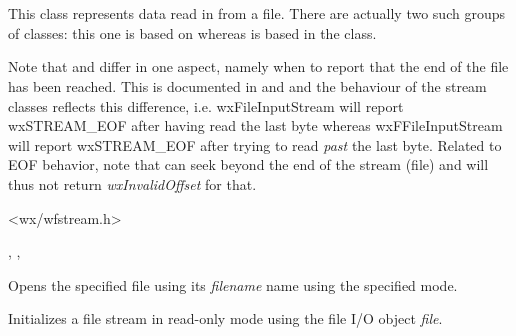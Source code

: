 \section{}\label{wxffileinputstream}

This class represents data read in from a file. There are actually
two such groups of classes: this one is based on  
whereas  is based in
the  class.

Note that  and  differ
in one aspect, namely when to report that the end of the file has been
reached. This is documented in  and 
 and the behaviour of the stream
classes reflects this difference, i.e. wxFileInputStream will report
wxSTREAM\_EOF after having read the last byte whereas wxFFileInputStream
will report wxSTREAM\_EOF after trying to read {\it past} the last byte.
Related to EOF behavior, note that  
can seek beyond the end of the stream (file) and will thus not return 
{\it wxInvalidOffset} for that.




<wx/wfstream.h>


, , 


\label{wxffileinputstreamctor}


Opens the specified file using its {\it filename} name using the specified mode.


Initializes a file stream in read-only mode using the file I/O object {\it file}.


